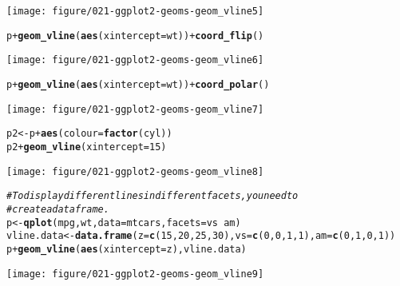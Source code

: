 \documentclass[a4paper,titlepage]{tufte-handout}\usepackage[]{graphicx}\usepackage[]{color}
\makeatletter
\def\maxwidth{ %
  \ifdim\Gin@nat@width>\linewidth
    \linewidth
  \else
    \Gin@nat@width
  \fi
}
\newcommand{\hlnum}[1]{\textcolor[rgb]{0.686,0.059,0.569}{#1}}%
\newcommand{\hlcom}[1]{\textcolor[rgb]{0.678,0.584,0.686}{\textit{#1}}}%
\newcommand{\hlopt}[1]{\textcolor[rgb]{0,0,0}{#1}}%
\newcommand{\hlstd}[1]{\textcolor[rgb]{0.345,0.345,0.345}{#1}}%
\newcommand{\hlkwb}[1]{\textcolor[rgb]{0.69,0.353,0.396}{#1}}%
\newcommand{\hlkwc}[1]{\textcolor[rgb]{0.333,0.667,0.333}{#1}}%
\newcommand{\hlkwd}[1]{\textcolor[rgb]{0.737,0.353,0.396}{\textbf{#1}}}%
\newenvironment{kframe}{%
 \def\at@end@of@kframe{}%
 \ifinner\ifhmode%
  \def\at@end@of@kframe{\end{minipage}}%
  \begin{minipage}{\columnwidth}%
 \fi\fi%
 \def\FrameCommand##1{\hskip\@totalleftmargin \hskip-\fboxsep
 \colorbox{shadecolor}{##1}\hskip-\fboxsep
     \hskip-\linewidth \hskip-\@totalleftmargin \hskip\columnwidth}%
 \MakeFramed {\advance\hsize-\width
   \@totalleftmargin\z@ \linewidth\hsize
   \@setminipage}}%
 {\par\unskip\endMakeFramed%
 \at@end@of@kframe}
\newenvironment{knitrout}{}{} %
\makeatother
\begin{document}
\begin{knitrout}
\begin{kframe}
\begin{alltt}
\end{alltt}
\end{kframe}
\texttt{[image: figure/021-ggplot2-geoms-geom\_vline5]} 
\begin{kframe}\begin{alltt}
\hlstd{p} \hlopt{+} \hlkwd{geom_vline}\hlstd{(}\hlkwd{aes}\hlstd{(}\hlkwc{xintercept} \hlstd{= wt))} \hlopt{+} \hlkwd{coord_flip}\hlstd{()}
\end{alltt}
\end{kframe}
\texttt{[image: figure/021-ggplot2-geoms-geom\_vline6]} 
\begin{kframe}\begin{alltt}
\hlstd{p} \hlopt{+} \hlkwd{geom_vline}\hlstd{(}\hlkwd{aes}\hlstd{(}\hlkwc{xintercept} \hlstd{= wt))} \hlopt{+} \hlkwd{coord_polar}\hlstd{()}
\end{alltt}
\end{kframe}
\texttt{[image: figure/021-ggplot2-geoms-geom\_vline7]} 
\begin{kframe}\begin{alltt}
\hlstd{p2} \hlkwb{<-} \hlstd{p} \hlopt{+} \hlkwd{aes}\hlstd{(}\hlkwc{colour} \hlstd{=} \hlkwd{factor}\hlstd{(cyl))}
\hlstd{p2} \hlopt{+} \hlkwd{geom_vline}\hlstd{(}\hlkwc{xintercept} \hlstd{=} \hlnum{15}\hlstd{)}
\end{alltt}
\end{kframe}
\texttt{[image: figure/021-ggplot2-geoms-geom\_vline8]} 
\begin{kframe}\begin{alltt}
\hlcom{# To display different lines in different facets, you need to}
\hlcom{# create a data frame.}
\hlstd{p} \hlkwb{<-} \hlkwd{qplot}\hlstd{(mpg, wt,} \hlkwc{data}\hlstd{=mtcars,} \hlkwc{facets} \hlstd{= vs} \hlopt{~} \hlstd{am)}
\hlstd{vline.data} \hlkwb{<-} \hlkwd{data.frame}\hlstd{(}\hlkwc{z} \hlstd{=} \hlkwd{c}\hlstd{(}\hlnum{15}\hlstd{,} \hlnum{20}\hlstd{,} \hlnum{25}\hlstd{,} \hlnum{30}\hlstd{),} \hlkwc{vs} \hlstd{=} \hlkwd{c}\hlstd{(}\hlnum{0}\hlstd{,} \hlnum{0}\hlstd{,} \hlnum{1}\hlstd{,} \hlnum{1}\hlstd{),} \hlkwc{am} \hlstd{=} \hlkwd{c}\hlstd{(}\hlnum{0}\hlstd{,} \hlnum{1}\hlstd{,} \hlnum{0}\hlstd{,} \hlnum{1}\hlstd{))}
\hlstd{p} \hlopt{+} \hlkwd{geom_vline}\hlstd{(}\hlkwd{aes}\hlstd{(}\hlkwc{xintercept} \hlstd{= z), vline.data)}
\end{alltt}
\end{kframe}
\texttt{[image: figure/021-ggplot2-geoms-geom\_vline9]} 

\end{knitrout}
\end{document}
